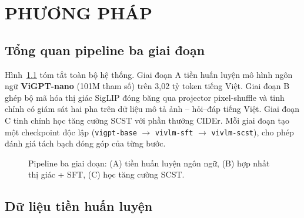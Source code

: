 \chapter{PHƯƠNG PHÁP}
\label{chap:methods}

\section{Tổng quan pipeline ba giai đoạn}
\label{sec:met-overview}

Hình~\ref{fig:pipeline} tóm tắt toàn bộ hệ thống. Giai đoạn A tiền huấn luyện
mô hình ngôn ngữ \textbf{ViGPT-nano} (101M tham số) trên 3,02 tỷ token tiếng
Việt. Giai đoạn B ghép bộ mã hóa thị giác SigLIP đóng băng qua projector
pixel-shuffle và tinh chỉnh có giám sát hai pha trên dữ liệu mô tả ảnh --
hỏi--đáp tiếng Việt. Giai đoạn C tinh chỉnh học tăng cường SCST với phần
thưởng CIDEr. Mỗi giai đoạn tạo một checkpoint độc lập
(\texttt{vigpt-base} $\to$ \texttt{vivlm-sft} $\to$ \texttt{vivlm-scst}),
cho phép đánh giá tách bạch đóng góp của từng bước.

\begin{figure}[H]
	\centering
	\caption{Pipeline ba giai đoạn: (A) tiền huấn luyện ngôn ngữ, (B) hợp nhất
	thị giác + SFT, (C) học tăng cường SCST.}
	\label{fig:pipeline}
\end{figure}

\section{Dữ liệu tiền huấn luyện}
\label{sec:met-pretrain-data}

